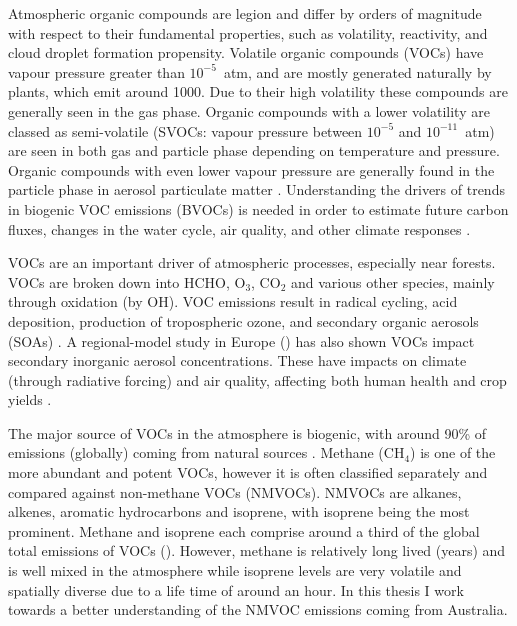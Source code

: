   Atmospheric organic compounds are legion and differ by orders of magnitude with respect to their fundamental properties, such as volatility, reactivity, and cloud droplet formation propensity.
  Volatile organic compounds (VOCs) have vapour pressure greater than $10^{-5}$~atm, and are mostly generated naturally by plants, which emit around 1000\tgpyr \citep{Guenther1995, Glasius2016}.
  Due to their high volatility these compounds are generally seen in the gas phase.
  Organic compounds with a lower volatility are classed as semi-volatile (SVOCs: vapour pressure between $10^{-5}$ and $10^{-11}$~atm) are seen in both gas and particle phase depending on temperature and pressure.
  Organic compounds with even lower vapour pressure are generally found in the particle phase in aerosol particulate matter \citep{Glasius2016}.
  Understanding the drivers of trends in biogenic VOC emissions (BVOCs) is needed in order to estimate future carbon fluxes, changes in the water cycle, air quality, and other climate responses \citep{Yue2015}.
  

  VOCs are an important driver of atmospheric processes, especially near forests.
  VOCs are broken down into HCHO, O$_3$, CO$_2$ and various other species, mainly through oxidation (by OH).
  VOC emissions result in radical cycling, acid deposition, production of tropospheric ozone, and secondary organic aerosols (SOAs) \citep{Atkinson2000, Kanakidou2005}.
  A regional-model study in Europe (\cite{Aksoyoglu2017}) has also shown VOCs impact secondary inorganic aerosol concentrations.
  These have impacts on climate (through radiative forcing) and air quality, affecting both human health and crop yields \citep{IPCC_Chapter2, Avnery2011, Lelieveld2015}.
  
  The major source of VOCs in the atmosphere is biogenic, with around 90\% of emissions (globally) coming from natural sources \citep{Guenther1995,Guenther2006, Millet2006}.
  Methane (CH$_4$) is one of the more abundant and potent VOCs, however it is often classified separately and compared against non-methane VOCs (NMVOCs).
  NMVOCs are alkanes, alkenes, aromatic hydrocarbons and isoprene, with isoprene being the most prominent.
  Methane and isoprene each comprise around a third of the global total emissions of VOCs (\cite{Guenther2006}).
  However, methane is relatively long lived (years) and is well mixed in the atmosphere while isoprene levels are very volatile and spatially diverse due to a life time of around an hour.
  In this thesis I work towards a better understanding of the NMVOC emissions coming from Australia.
  
